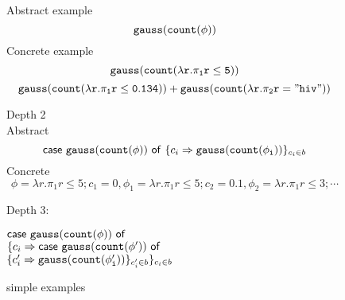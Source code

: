 \documentclass{article}
\begin{document}
\clearpage
\begin{figure}
    Abstract example
$$
{\tt gauss}({\tt {\tt count}(\phi)})
$$
Concrete example
$$
{\tt gauss}({\tt {\tt count}(\lambda r. \pi_1 r \leq 5)})
$$
$$
{\tt gauss}({\tt {\tt count}(\lambda r. \pi_1 r \leq 0.134)}) +
{\tt gauss}({\tt {\tt count}(\lambda r. \pi_2 r = "hiv")})
$$

Depth 2\\
Abstract
  $$  \mathsf{case}~ {\tt gauss}({\tt {\tt count}(\phi)})  ~\mathsf{of}\ \{c_i \Rightarrow {{\tt gauss}({\tt {\tt count}(\phi_i)})} \}_{c_i \in b} $$
Concrete
 $$ \phi =  \lambda r. \pi_1 r \leq 5 ; c_1 = 0, \phi_1 =  \lambda r. \pi_1 r \leq 5 ;  c_2 = 0.1,  \phi_2 =  \lambda r. \pi_1 r \leq 3; \cdots $$
 
 Depth 3: \\
    \begin{tabbing}
    $\mathsf{case}~ {\tt gauss}({\tt {\tt count}(\phi)})  ~\mathsf{of}$ \\ $\{c_i \Rightarrow \mathsf{case}~ {\tt gauss}({\tt {\tt count}(\phi')})  ~\mathsf{of}$ \\ $\{c_i' \Rightarrow {{\tt gauss}({\tt {\tt count}(\phi_i')})} \}_{c_i' \in b} \}_{c_i \in b}$
\end{tabbing}    

    \caption{simple examples}
    \label{fig:my_label}
\end{figure}
\end{document}
